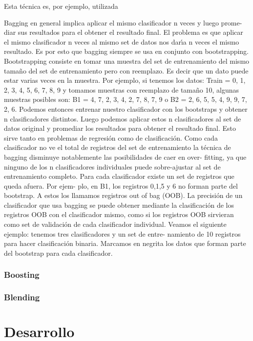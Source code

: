 \documentclass[a4paper]{article}
\begin{document}
Esta técnica es, por ejemplo, utilizada

Bagging en general implica aplicar el mismo clasificador n veces y luego prome-
diar sus resultados para el obtener el resultado final. El problema es que aplicar
el mismo clasificador n veces al mismo set de datos nos darı́a n veces el mismo
resultado. Es por esto que bagging siempre se usa en conjunto con bootstrapping.
Bootstrapping consiste en tomar una muestra del set de entrenamiento del
mismo tamaño del set de entrenamiento pero con reemplazo. Es decir que
un dato puede estar varias veces en la muestra. Por ejemplo, si tenemos los
datos: Train = 0, 1, 2, 3, 4, 5, 6, 7, 8, 9 y tomamos muestras con reemplazo de
tamaño 10, algunas muestras posibles son: B1 = 4, 7, 2, 3, 4, 2, 7, 8, 7, 9 o B2 =
2, 6, 5, 5, 4, 9, 9, 7, 2, 6. Podemos entonces entrenar nuestro clasificador con los
bootstraps y obtener n clasificadores distintos. Luego podemos aplicar estos n
clasificadores al set de datos original y promediar los resultados para obtener el
resultado final. Esto sirve tanto en problemas de regresión como de clasificación.
Como cada clasificador no ve el total de registros del set de entrenamiento
la técnica de bagging disminuye notablemente las posibilidades de caer en over-
fitting, ya que ninguno de los n clasificadores individuales puede sobre-ajustar
al set de entrenamiento completo.
Para cada clasificador existe un set de registros que queda afuera. Por ejem-
plo, en B1, los registros 0,1,5 y 6 no forman parte del bootstrap. A estos los
llamamos registros out of bag (OOB). La precisión de un clasificador que usa
bagging se puede obtener mediante la clasificación de los registros OOB con el
clasificador mismo, como si los registros OOB sirvieran como set de validación
de cada clasificador individual.
Veamos el siguiente ejemplo: tenemos tres clasificadores y un set de entre-
namiento de 10 registros para hacer clasificación binaria. Marcamos en negrita
los datos que forman parte del bootstrap para cada clasificador.



\subsubsection{Boosting}
\subsubsection{Blending}

\section{Desarrollo}
\end{document}
